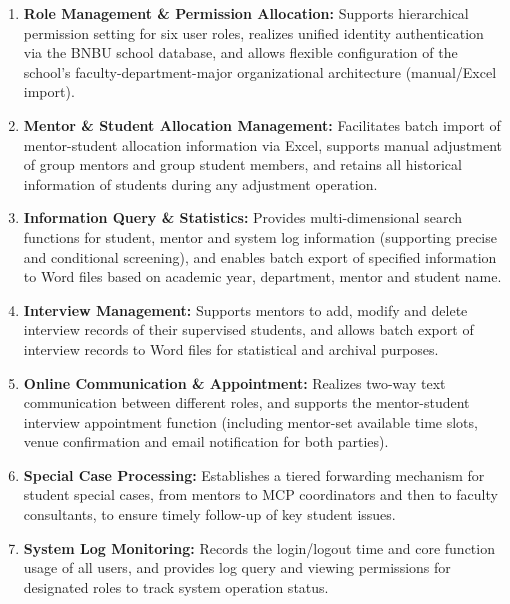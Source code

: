 \documentclass[a4paper,12pt]{article}
\begin{document}
\begin{sloppypar}
\begin{enumerate}
\item \textbf{Role Management \& Permission Allocation:} Supports hierarchical permission setting for six user roles, realizes unified identity authentication via the BNBU school database, and allows flexible configuration of the school's faculty-department-major organizational architecture (manual/Excel import).

\item \textbf{Mentor \& Student Allocation Management:} Facilitates batch import of mentor-student allocation information via Excel, supports manual adjustment of group mentors and group student members, and retains all historical information of students during any adjustment operation.

\item \textbf{Information Query \& Statistics:} Provides multi-dimensional search functions for student, mentor and system log information (supporting precise and conditional screening), and enables batch export of specified information to Word files based on academic year, department, mentor and student name.

\item \textbf{Interview Management:} Supports mentors to add, modify and delete interview records of their supervised students, and allows batch export of interview records to Word files for statistical and archival purposes.

\item \textbf{Online Communication \& Appointment:} Realizes two-way text communication between different roles, and supports the mentor-student interview appointment function (including mentor-set available time slots, venue confirmation and email notification for both parties).

\item \textbf{Special Case Processing:} Establishes a tiered forwarding mechanism for student special cases, from mentors to MCP coordinators and then to faculty consultants, to ensure timely follow-up of key student issues.

\item \textbf{System Log Monitoring:} Records the login/logout time and core function usage of all users, and provides log query and viewing permissions for designated roles to track system operation status.
\end{enumerate}
\end{sloppypar}
\end{document}
